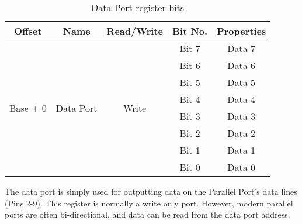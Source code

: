\begin{table}[h]
\centering
\bgroup
\def\arraystretch{1.5}
\begin{tabular}{|c|c|c|c|c|}
\hline
\textbf{Offset}           & \textbf{Name}              & \textbf{Read/Write}    & \textbf{Bit No.} & \textbf{Properties} \\ \hline
\multirow{8}{*}{Base + 0} & \multirow{8}{*}{Data Port} & \multirow{8}{*}{Write} & Bit 7            & Data 7              \\ \cline{4-5} 
                          &                            &                        & Bit 6            & Data 6              \\ \cline{4-5} 
                          &                            &                        & Bit 5            & Data 5              \\ \cline{4-5} 
                          &                            &                        & Bit 4            & Data 4              \\ \cline{4-5} 
                          &                            &                        & Bit 3            & Data 3              \\ \cline{4-5} 
                          &                            &                        & Bit 2            & Data 2              \\ \cline{4-5} 
                          &                            &                        & Bit 1            & Data 1              \\ \cline{4-5} 
                          &                            &                        & Bit 0            & Data 0              \\ \hline
\end{tabular}
\caption{Data Port register bits}
\egroup
\end{table}

The data port is simply used for outputting data on the Parallel Port's data lines (Pins 2-9). This register is normally a write only port. However, modern parallel ports are often bi-directional, and data can be read from the data port address.

